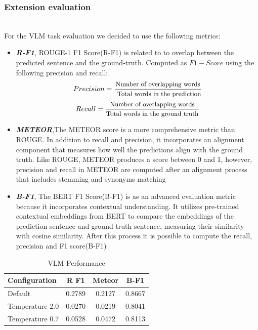 \documentclass[conference]{IEEEtran}
\begin{document}
\subsubsection{Extension evaluation}
\hspace{1cm} \\
For the VLM task evaluation we decided to use the following metrics:
\begin{itemize}
    \item \textit{\textbf{R-F1}}, ROUGE-1 F1 Score(R-F1) is related to to overlap between the predicted sentence and the ground-truth. Computed as $F1-Score$ using the following precision and recall: 
    \begin{equation*}
        Precision = \frac{\text{\small Number of overlapping words}}{\text{ \small Total words in the prediction}}
    \end{equation*}
     \begin{equation}
        Recall = \frac{\text{\small Number of overlapping words}}{\text{\small Total words in the ground truth}}
    \end{equation}
    \item \textit{\textbf{METEOR}},The METEOR score is a more comprehensive metric than ROUGE. In addition to recall and precision, it incorporates an alignment component that measures how well the predictions align with the ground truth. Like ROUGE, METEOR produces a score between 0 and 1, however, precision and recall in METEOR are computed after an alignment process that includes stemming and synonyms matching
    \item \textit{\textbf{B-F1}}, The BERT F1 Score(B-F1) is as an advanced evaluation metric because it incorporates contextual understanding. It utilizes pre-trained contextual embeddings from BERT to compare the embeddings of the prediction sentence and ground truth sentence, measuring their similarity with cosine similarity. After this process it is possible to compute the recall, precision and F1 score(B-F1)
\end{itemize}

\begin{table}[h]
\centering
\caption{VLM Performance}
\label{tab:comparisonSCore}
\begin{tabular}{@{}lccc@{}}
\toprule
Configuration & R F1 & Meteor & B-F1 \\ \midrule
Default & 0.2789 & 0.2127 & 0.8667 \\
Temperature 2.0 & 0.0270 & 0.0219 & 0.8041 \\
Temperature 0.7 & 0.0528 & 0.0472 & 0.8113 \\
\bottomrule
\end{tabular}
\end{table}
\end{document}
